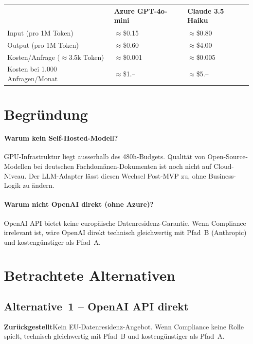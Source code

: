 \documentclass[a4paper, 11pt, oneside]{report}
\newcommand{\zurueckgestellt}{\colorbox{notebg}{\small\bfseries\color{noteframe}Zur\"{u}ckgestellt}\;}
\begin{document}
\begin{table}[htb]
\small\centering
\begin{tabular}{@{}L{5.5cm} L{4cm} L{4cm}@{}}
\toprule
{}
 & \textbf{Azure GPT-4o-mini} & \textbf{Claude 3.5 Haiku} \\
\midrule
Input (pro 1M Token)           & $\approx$\$0.15  & $\approx$\$0.80  \\
Output (pro 1M Token)          & $\approx$\$0.60  & $\approx$\$4.00  \\
Kosten/Anfrage ($\approx$3.5k Token) & $\approx$\$0.001 & $\approx$\$0.005 \\
Kosten bei 1.000 Anfragen/Monat & $\approx$\$1.--  & $\approx$\$5.--  \\
\bottomrule
\end{tabular}
\end{table}

\section{Begründung}

\paragraph{Warum kein Self-Hosted-Modell?}
GPU-Infrastruktur liegt ausserhalb des 480h-Budgets. Qualität von
Open-Source-Modellen bei deutschen Fachdomänen-Dokumenten ist noch
nicht auf Cloud-Niveau. Der LLM-Adapter lässt diesen Wechsel Post-MVP
zu, ohne Business-Logik zu ändern.

\paragraph{Warum nicht OpenAI direkt (ohne Azure)?}
OpenAI API bietet keine europäische Datenresidenz-Garantie.
Wenn Compliance irrelevant ist, wäre OpenAI direkt technisch
gleichwertig mit Pfad~B (Anthropic) und kostengünstiger als Pfad~A.

\section{Betrachtete Alternativen}

\subsection{Alternative~1 -- OpenAI API direkt}

\zurueckgestellt Kein EU-Datenresidenz-Angebot. Wenn Compliance keine Rolle
spielt, technisch gleichwertig mit Pfad~B und kostengünstiger als Pfad~A.
\end{document}
